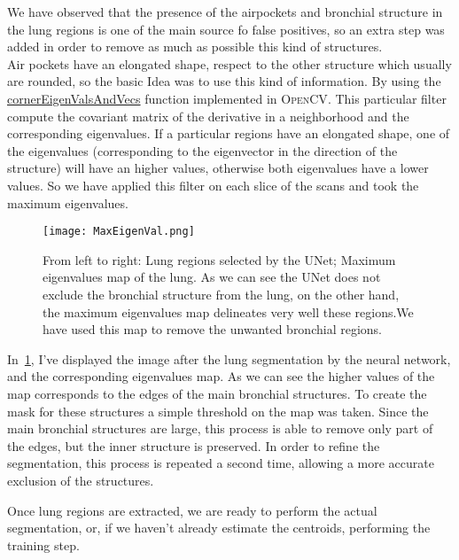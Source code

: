 \documentclass{standalone}
\begin{document}
	We have observed that the presence of the airpockets and bronchial structure in the lung regions is one of the main source fo false positives, so an extra step was added in order to remove as much as possible this kind of structures.\\ Air pockets have an elongated shape, respect to the other structure which usually are rounded, so the basic Idea was to use this kind of information. By using the \href{https://www.docs.opencv.org/master/dd/d1a/group__imgproc__feature.html#ga04723e007ed888ddf11d9ba04e2232de}{cornerEigenValsAndVecs} function implemented in \textsc{OpenCV}. This particular filter compute the covariant matrix of the derivative in a neighborhood and the corresponding eigenvalues. If a particular regions have an elongated shape, one of the eigenvalues (corresponding to the eigenvector in the direction of the structure) will have an higher values, otherwise both eigenvalues have a lower values. So we have applied this filter on each slice of the scans and took the maximum eigenvalues. 
	\begin{figure}[h!]
		\centering
			\texttt{[image: MaxEigenVal.png]}
			\caption{From left to right: Lung regions selected by the UNet; Maximum eigenvalues map of the lung. As we can see the UNet does not exclude the bronchial structure from the lung, on the other hand, the maximum eigenvalues map delineates very well these regions.We have used this map to remove the unwanted bronchial regions.}\label{fig:MaxEigenval}
	\end{figure}

	In \figurename\,\ref{fig:MaxEigenval}, I've displayed the image after the lung segmentation by the neural network, and the corresponding eigenvalues map. As we can see the higher values of the map corresponds to the edges of the main bronchial structures. To create the mask for these structures a simple threshold on the map was taken. Since the main bronchial structures are large, this process is able to remove only part of the edges, but the inner structure is preserved. In order to refine the segmentation, this process is repeated a second time, allowing a more accurate exclusion of the structures.
		
	Once lung regions are extracted, we are ready to perform the actual segmentation, or, if we haven't already estimate the centroids, performing the training step.\\
	
\end{document}
